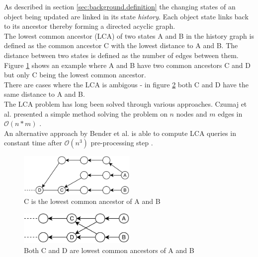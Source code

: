 As described in section \ref{sec:background.definition} the changing states of an object being updated are linked in its state \emph{history}.
Each object state links back to its ancestor thereby forming a directed acyclic graph.\\
The lowest common ancestor (LCA) of two states A and B in the history graph is defined as the common ancestor C with the lowest distance to A and B.
The distance between two states is defined as the number of edges between them.
Figure \ref{fig:background.lca.one} shows an example where A and B have two common ancestors C and D but only C being the lowest common ancestor.\\
There are cases where the LCA is ambigous - in figure \ref{fig:background.lca.two} both C and D have the same distance to A and B.\\
The LCA problem has long been solved through various approaches.
Czumaj et al. presented a simple method solving the problem on  $ n $ nodes and $ m $ edges in $\mathcal O(n*m)$ \cite{Czumaj:2007ht}.\\
An alternative approach by Bender et al. is able to compute LCA queries in constant time after $\mathcal O(n^3) $ pre-processing step \cite{Bender:2005dg}.

\begin{figure}[lca-one]
  \centering
  \includegraphics[width=0.5\textwidth]{img/lca1}
  \caption{C is the lowest common ancestor of A and B}
  \label{fig:background.lca.one}
\end{figure}

\begin{figure}[lca-two]
  \centering
  \includegraphics[width=0.5\textwidth]{img/lca2}
  \caption{Both C and D are lowest common ancestors of A and B}
  \label{fig:background.lca.two}
\end{figure}

